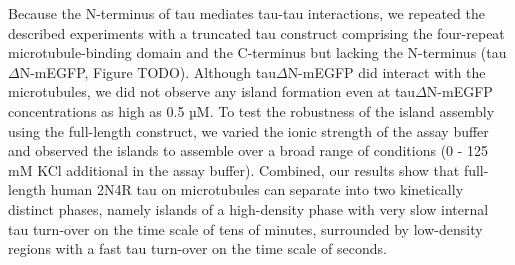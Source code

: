 Because the N-terminus of tau mediates tau-tau interactions\parencite{Gamblin2003}, we repeated the described experiments with a truncated tau construct comprising the four-repeat microtubule-binding domain and the C-terminus but lacking the N-terminus (tau$\Delta$N-mEGFP, Figure TODO). Although tau$\Delta$N-mEGFP did interact with the microtubules, we did not observe any island formation even at tau$\Delta$N-mEGFP concentrations as high as 0.5 µM. To test the robustness of the island assembly using the full-length construct, we varied the ionic strength of the assay buffer and observed the islands to assemble over a broad range of conditions (0 - 125 mM KCl additional in the assay buffer). Combined, our results show that full-length human 2N4R tau on microtubules can separate into two kinetically distinct phases, namely islands of a high-density phase with very slow internal tau turn-over on the time scale of tens of minutes, surrounded by low-density regions with a fast tau turn-over on the time scale of seconds.


